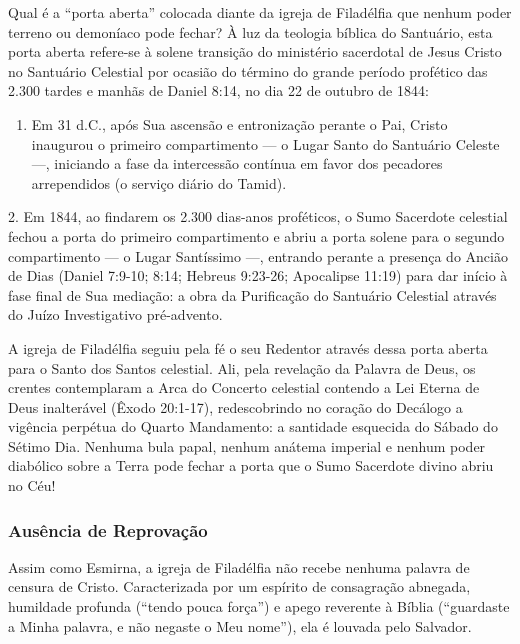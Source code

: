 \documentclass[11pt,a4paper,openany]{book}
\begin{document}
Qual é a ``porta aberta'' colocada diante da igreja de Filadélfia que nenhum poder terreno ou demoníaco pode fechar?
À luz da teologia bíblica do Santuário, esta porta aberta refere-se à solene transição do ministério sacerdotal de Jesus Cristo no Santuário Celestial por ocasião do término do grande período profético das 2.300 tardes e manhãs de Daniel 8:14, no dia 22 de outubro de 1844:
\begin{enumerate}
  \item Em 31 d.C., após Sua ascensão e entronização perante o Pai, Cristo inaugurou o primeiro compartimento — o Lugar Santo do Santuário Celeste —, iniciando a fase da intercessão contínua em favor dos pecadores arrependidos (o serviço diário do Tamid).
\end{enumerate}

2. Em 1844, ao findarem os 2.300 dias-anos proféticos, o Sumo Sacerdote celestial fechou a porta do primeiro compartimento e abriu a porta solene para o segundo compartimento — o Lugar Santíssimo —, entrando perante a presença do Ancião de Dias (Daniel 7:9-10; 8:14; Hebreus 9:23-26; Apocalipse 11:19) para dar início à fase final de Sua mediação: a obra da Purificação do Santuário Celestial através do Juízo Investigativo pré-advento.

A igreja de Filadélfia seguiu pela fé o seu Redentor através dessa porta aberta para o Santo dos Santos celestial. Ali, pela revelação da Palavra de Deus, os crentes contemplaram a Arca do Concerto celestial contendo a Lei Eterna de Deus inalterável (Êxodo 20:1-17), redescobrindo no coração do Decálogo a vigência perpétua do Quarto Mandamento: a santidade esquecida do Sábado do Sétimo Dia. Nenhuma bula papal, nenhum anátema imperial e nenhum poder diabólico sobre a Terra pode fechar a porta que o Sumo Sacerdote divino abriu no Céu!


\subsubsection*{Ausência de Reprovação}
Assim como Esmirna, a igreja de Filadélfia não recebe nenhuma palavra de censura de Cristo. Caracterizada por um espírito de consagração abnegada, humildade profunda (``tendo pouca força'') e apego reverente à Bíblia (``guardaste a Minha palavra, e não negaste o Meu nome''), ela é louvada pelo Salvador.
\end{document}
